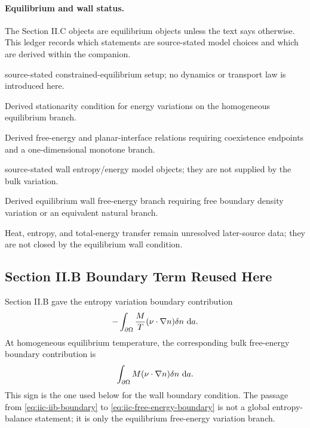 \paragraph{Equilibrium and wall status.}
The Section II.C objects are equilibrium objects unless the text says
otherwise.  This ledger records which statements are source-stated model choices
and which are derived within the companion.
\begin{description}[leftmargin=2.8cm,style=nextline]
\item[\(W,N,\beta,\lambda_N\)] source-stated constrained-equilibrium setup;
no dynamics or transport law is introduced here.
\item[\(T=1/(k_B\beta)\)] Derived stationarity condition for energy variations
on the homogeneous equilibrium branch.
\item[\(F\), \(g_{\mathrm{gp}}\), first integral] Derived free-energy and
planar-interface relations requiring coexistence endpoints and a
one-dimensional monotone branch.
\item[\(S_s,E_s,\sigma_s,e_s\)] source-stated wall entropy/energy model
objects; they are not supplied by the bulk variation.
\item[\(f_s\), \(F_{\mathrm{tot}}\), Eq.~\eqref{eq:iic-natural-wall-condition}]
Derived equilibrium wall free-energy branch requiring free boundary density
variation or an equivalent natural branch.
\item[Dynamic wall transfer] Heat, entropy, and total-energy transfer remain
unresolved later-source data; they are not closed by the equilibrium wall
condition.
\end{description}


\subsection{Section II.B Boundary Term Reused Here}

Section II.B gave the entropy variation boundary contribution
\begin{equation}
  -\int_{\partial\Omega}
  \frac{M}{T}(\nu\cdot\nabla n)\delta n\,\,\mathrm{d} a .
  \label{eq:iic-iib-boundary}
\end{equation}
At homogeneous equilibrium temperature, the corresponding bulk free-energy
boundary contribution is
\begin{equation}
  \int_{\partial\Omega}
  M(\nu\cdot\nabla n)\delta n\,\,\mathrm{d} a .
  \label{eq:iic-free-energy-boundary}
\end{equation}
This sign is the one used below for the wall boundary condition.  The passage
from \eqref{eq:iic-iib-boundary} to \eqref{eq:iic-free-energy-boundary} is not
a global entropy-balance statement; it is only the equilibrium free-energy
variation branch.

